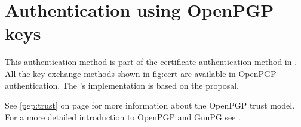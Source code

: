 \section{Authentication using OpenPGP keys}
\label{sec:pgp}

This authentication method is part of the certificate authentication
method in \gnutls{}. All the key exchange methods shown in \hyperref{figure}{figure }{}{fig:cert} are
available in OpenPGP authentication. The \gnutls{}'s implementation is based on the
\cite{TLSPGP} proposal.

See \ref{pgp:trust} on page \pageref{pgp:trust} for more information 
about the OpenPGP trust model. For a more detailed introduction to OpenPGP
and GnuPG see \cite{GPGH}.
